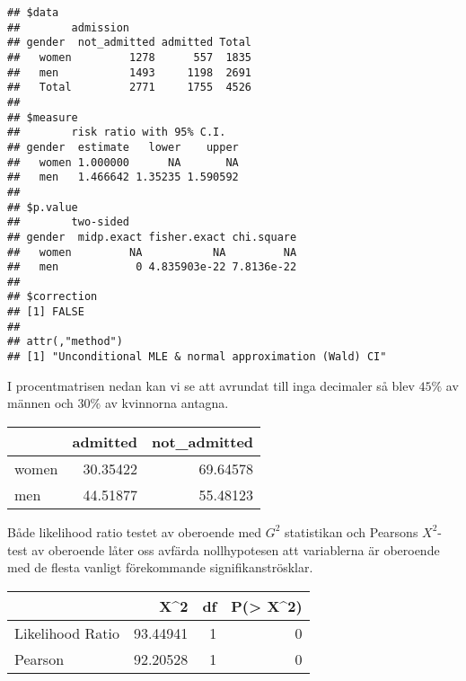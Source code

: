 \documentclass[]{article}
\newenvironment{Shaded}{\begin{snugshade}}{\end{snugshade}}
\newcommand{\KeywordTok}[1]{\textcolor[rgb]{0.13,0.29,0.53}{\textbf{#1}}}
\newcommand{\NormalTok}[1]{#1}
\newcommand{\OperatorTok}[1]{\textcolor[rgb]{0.81,0.36,0.00}{\textbf{#1}}}
\newcommand{\StringTok}[1]{\textcolor[rgb]{0.31,0.60,0.02}{#1}}
\begin{document}
\begin{verbatim}
## $data
##        admission
## gender  not_admitted admitted Total
##   women         1278      557  1835
##   men           1493     1198  2691
##   Total         2771     1755  4526
## 
## $measure
##        risk ratio with 95% C.I.
## gender  estimate   lower    upper
##   women 1.000000      NA       NA
##   men   1.466642 1.35235 1.590592
## 
## $p.value
##        two-sided
## gender  midp.exact fisher.exact chi.square
##   women         NA           NA         NA
##   men            0 4.835903e-22 7.8136e-22
## 
## $correction
## [1] FALSE
## 
## attr(,"method")
## [1] "Unconditional MLE & normal approximation (Wald) CI"
\end{verbatim}

I procentmatrisen nedan kan vi se att avrundat till inga decimaler så
blev \(45 \%\) av männen och \(30 \%\) av kvinnorna antagna.

\begin{Shaded}
\end{Shaded}

\begin{longtable}[]{@{}lrr@{}}
\toprule
& admitted & not\_admitted\tabularnewline
\midrule
\endhead
women & 30.35422 & 69.64578\tabularnewline
men & 44.51877 & 55.48123\tabularnewline
\bottomrule
\end{longtable}

Både likelihood ratio testet av oberoende med \(G^{2}\) statistikan och
Pearsons \(X^{2}\)-test av oberoende låter oss avfärda nollhypotesen att
variablerna är oberoende med de flesta vanligt förekommande
signifikanströsklar.

\begin{Shaded}
\end{Shaded}

\begin{longtable}[]{@{}lrrr@{}}
\toprule
& X\^{}2 & df & P(\textgreater{} X\^{}2)\tabularnewline
\midrule
\endhead
Likelihood Ratio & 93.44941 & 1 & 0\tabularnewline
Pearson & 92.20528 & 1 & 0\tabularnewline
\bottomrule
\end{longtable}
\end{document}
